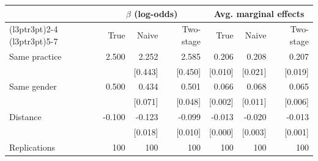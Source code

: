
\begin{tabular}{lrrrrrr}
\toprule
\multicolumn{1}{c}{ } & \multicolumn{3}{c}{$\beta$ (log-odds)} & \multicolumn{3}{c}{Avg. marginal effects} \\
\cmidrule(l{3pt}r{3pt}){2-4} \cmidrule(l{3pt}r{3pt}){5-7}
 & True & Naive & Two-stage & True & Naive & Two-stage\\
\midrule
Same practice & 2.500 & 2.252 & 2.585 & 0.206 & 0.208 & 0.207\\
 &  & {}[0.443] & {}[0.450] & {}[0.010] & {}[0.021] & {}[0.019]\\
Same gender & 0.500 & 0.434 & 0.501 & 0.066 & 0.068 & 0.065\\
 &  & {}[0.071] & {}[0.048] & {}[0.002] & {}[0.011] & {}[0.006]\\
Distance & -0.100 & -0.123 & -0.099 & -0.013 & -0.020 & -0.013\\
 &  & {}[0.018] & {}[0.010] & {}[0.000] & {}[0.003] & {}[0.001]\\
Replications & 100 & 100 & 100 & 100 & 100 & 100\\
\bottomrule
\end{tabular}
